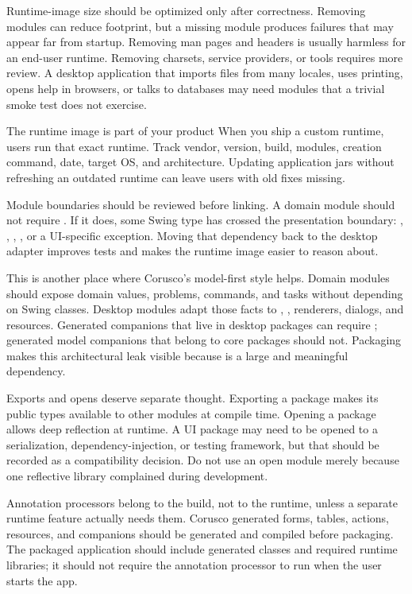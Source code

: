 Runtime-image size should be optimized only after correctness. Removing modules can reduce footprint, but a missing module produces failures that may appear far from startup. Removing man pages and headers is usually harmless for an end-user runtime. Removing charsets, service providers, or tools requires more review. A desktop application that imports files from many locales, uses printing, opens help in browsers, or talks to databases may need modules that a trivial smoke test does not exercise.

\begin{detailbox}{The runtime image is part of your product}
When you ship a custom runtime, users run that exact runtime. Track vendor, version, build, modules, creation command, date, target OS, and architecture. Updating application jars without refreshing an outdated runtime can leave users with old fixes missing.
\end{detailbox}

Module boundaries should be reviewed before linking. A domain module should not require . If it does, some Swing type has crossed the presentation boundary: , , , , or a UI-specific exception. Moving that dependency back to the desktop adapter improves tests and makes the runtime image easier to reason about.

This is another place where Corusco's model-first style helps. Domain modules should expose domain values, problems, commands, and tasks without depending on Swing classes. Desktop modules adapt those facts to , , renderers, dialogs, and resources. Generated companions that live in desktop packages can require ; generated model companions that belong to core packages should not. Packaging makes this architectural leak visible because  is a large and meaningful dependency.

Exports and opens deserve separate thought. Exporting a package makes its public types available to other modules at compile time. Opening a package allows deep reflection at runtime. A UI package may need to be opened to a serialization, dependency-injection, or testing framework, but that should be recorded as a compatibility decision. Do not use an open module merely because one reflective library complained during development.

Annotation processors belong to the build, not to the runtime, unless a separate runtime feature actually needs them. Corusco generated forms, tables, actions, resources, and companions should be generated and compiled before packaging. The packaged application should include generated classes and required runtime libraries; it should not require the annotation processor to run when the user starts the app.

